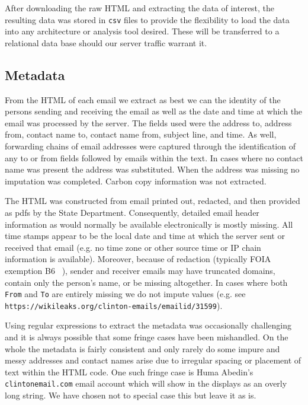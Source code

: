 \documentclass[journal]{vgtc}                %
\begin{document}
After downloading the raw HTML and extracting the data of interest, the resulting data was stored in \texttt{csv} files to provide the flexibility to load the data into any architecture or analysis tool desired.  These will be transferred to a relational data base should our server traffic warrant it.

\subsection{Metadata}
\label{sect:data:metadata}
From the HTML of each email we extract as best we can the identity of the persons sending and receiving the email as well as the date and time at which the email was processed by the server. The fields used were the address to, address from, contact name to, contact name from, subject line, and time. As well, forwarding chains of email addresses were captured through the identification of any to or from fields followed by emails within the text. In cases where no contact name was present the address was substituted. When the address was missing no imputation was completed. Carbon copy information was not extracted.

The HTML was constructed from email printed out, redacted, and then provided as pdfs by the State Department.  Consequently, detailed email header information as would normally be available electronically is mostly missing.   All time stamps appear to be the local date and time at which the server sent or received that email (e.g. no time zone or other source time or IP chain information is available).  Moreover, because of redaction (typically FOIA exemption B6 ~\cite{FOIA}),  sender and receiver emails may have truncated domains,  contain only the person's name, or be missing altogether.  In cases where both \texttt{From} and \texttt{To} are entirely missing we do not impute values  (e.g. see \texttt{https://wikileaks.org/clinton-emails/emailid/31599}).

Using regular expressions to extract the metadata was occasionally challenging and it is always possible that some fringe cases have been mishandled.  On the whole the metadata is fairly consistent and only rarely do some impure and messy addresses and contact names arise  due to irregular spacing or placement of text within the HTML code.  One such fringe case is Huma Abedin's \texttt{clintonemail.com} email account which will show in the displays as an overly long string.  We have chosen not to special case this but leave it as is.
\end{document}
